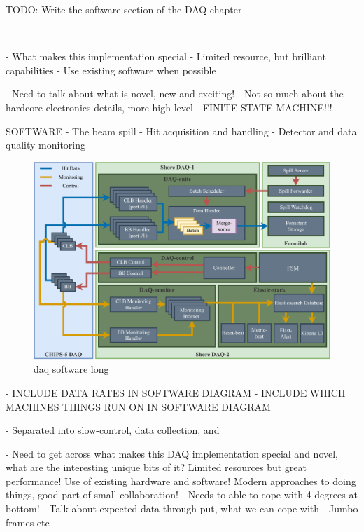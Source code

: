 TODO: Write the software section of the DAQ chapter

~\cite{chipsdaq2020}

- What makes this implementation special
- Limited resource, but brilliant capabilities
- Use existing software when possible

- Need to talk about what is novel, new and exciting!
- Not so much about the hardcore electronics details, more high level
- FINITE STATE MACHINE!!!

SOFTWARE
- The beam spill
- Hit acquisition and handling
- Detector and data quality monitoring

\begin{figure} %
    \includegraphics[width=\textwidth]{diagrams/5-daq/daq_software.pdf}
    \caption[daq software short]
    {daq software long}
    \label{fig:daq_software}
\end{figure}

- INCLUDE DATA RATES IN SOFTWARE DIAGRAM
- INCLUDE WHICH MACHINES THINGS RUN ON IN SOFTWARE DIAGRAM

- Separated into slow-control, data collection, and

- Need to get across what makes this DAQ implementation special and novel, what are the
interesting unique bits of it? Limited resources but great performance! Use of existing hardware
and software! Modern approaches to doing things, good part of small collaboration!
- Needs to able to cope with 4 degrees at bottom!
- Talk about expected data through put, what we can cope with
- Jumbo frames etc

